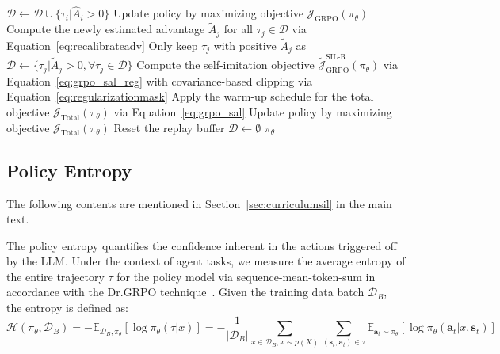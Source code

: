 \documentclass[]{youtu} %
\begin{document}
\begin{algorithm}[htbp]
\begin{algorithmic}[1]
    \ENDWHILE
        \STATE {\color{darkgreen}{\# Add trajectories into the buffer only when their advantages are positive}}
        \STATE $\mathcal{D}\leftarrow \mathcal{D}\cup \{\tau_{i}|\hat{A}_{i}>0\}$
        \STATE {\color{darkgreen}{\# Apply on-Policy update with the vanilla GRPO}}
        \STATE Update policy by maximizing objective $\mathcal{J}_{\text{GRPO}}(\pi_\theta)$
    \ELSE
        \STATE {\color{darkgreen}{\# Recalibrate the advantage}}
        \STATE Compute the newly estimated advantage $\tilde{A}_j$ for all $\tau_j\in\mathcal{D}$ via Equation~\ref{eq:recalibrateadv}
        \STATE Only keep $\tau_j$ with positive $\tilde{A}_j$ as $\mathcal{D}\leftarrow \{\tau_j|\tilde{A}_j>0,\forall\tau_j\in\mathcal{D}\}$
        \STATE {\color{darkgreen}{\# Apply regularization on self-imitation learning}}
        \STATE Compute the self-imitation objective $\tilde{\mathcal{J}}_{\text{GRPO}}^{\text{SIL-R}}(\pi_\theta)$ via Equation~\ref{eq:grpo_sal_reg}  with covariance-based clipping via Equation~\ref{eq:regularizationmask}
        \STATE Apply the warm-up schedule for the total objective $\mathcal{J}_{\text{Total}}(\pi_\theta)$ via Equation~\ref{eq:grpo_sal}
        \STATE {\color{darkgreen}{\# Apply both the on-policy and the off-policy update for self-imitation}}
        \STATE Update policy by maximizing objective $\mathcal{J}_{\text{Total}}(\pi_\theta)$
        \STATE Reset the replay buffer $\mathcal{D}\leftarrow\emptyset$
    \ENDIF
\ENDFOR
\RETURN $\pi_{\theta}$
\end{algorithmic}
\end{algorithm}



\clearpage
\newpage



\subsection{Policy Entropy}
\label{sec:policyentropydef}

The following contents are mentioned in Section~\ref{sec:curriculumsil} in the main text.


The policy entropy quantifies the confidence inherent in the actions triggered off by the LLM.
Under the context of agent tasks,
we measure the average entropy of the entire trajectory $\tau$ for the policy model via sequence-mean-token-sum in accordance with the Dr.GRPO technique~\cite{liu2025understanding}.
Given the training data batch $\mathcal{D}_B$,
the entropy is defined as:
\begin{equation}\label{eq:entropysum}
    \mathcal{H}(\pi_\theta, \mathcal{D}_B)=-\mathbb{E}_{\mathcal{D}_B, \pi_\theta}[\log \pi_\theta(\tau|x)]=-\frac{1}{|\mathcal{D}_B|}\sum_{x\in\mathcal{D}_B, x\sim p(X)}\sum_{(\mathbf{s}_{t},\mathbf{a}_{t})\in\tau}\mathbb{E}_{\mathbf{a}_{t}\sim \pi_\theta}[\log \pi_\theta(\mathbf{a}_{t}|x,\mathbf{s}_t)]
\end{equation}
\end{document}
